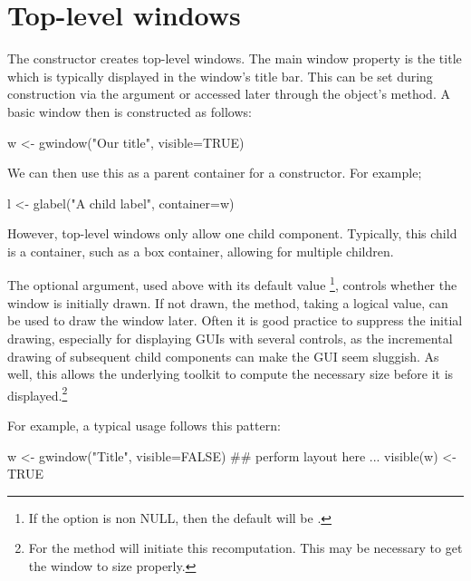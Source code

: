 \section{Top-level windows}
\label{sec:gWidgets-top-level-windows}

The  constructor creates top-level windows. The
main window property is the title which is typically displayed in the
window's title bar. This can be set during construction via the
 argument or accessed later through the object's
 method. A basic window then is constructed as follows:

\begin{Schunk}
\begin{Sinput}
 w <- gwindow("Our title", visible=TRUE)
\end{Sinput}
\end{Schunk}
%

We can then use this as a parent container for a constructor. For example;
\begin{Schunk}
\begin{Sinput}
 l <- glabel("A child label", container=w)
\end{Sinput}
\end{Schunk}
%
However, top-level windows only allow one child component. Typically,
this child is a container, such as a box container, allowing for
multiple children.


The optional  argument, used above with its
default value \footnote{If the option
   is non NULL, then
  the default will be .}, controls whether the window is
initially drawn. If not drawn, the 
method, taking a logical value, can be used to draw the window later.
Often it is good practice to suppress the initial drawing, especially
for displaying GUIs with several controls, as the incremental drawing
of subsequent child components can make the GUI seem sluggish. As
well, this allows the underlying toolkit to compute the necessary size
before it is displayed.\footnote{For  the 
method will initiate this recomputation. This may be necessary to get the
window to size properly.}

For example, a typical usage follows this pattern:
\begin{Schunk}
\begin{Sinput}
 w <- gwindow("Title", visible=FALSE)
 ## perform layout here ...
 visible(w) <- TRUE
\end{Sinput}
\end{Schunk}

